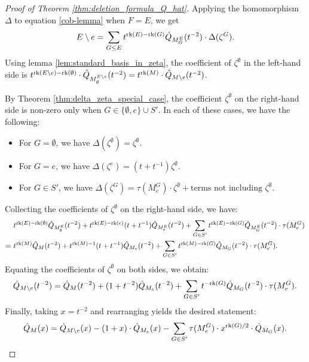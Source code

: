\documentclass[10pt]{article}
\newcommand{\rank}{\normalfont\text{rk}}
\theoremstyle{remark}
\begin{document}
\begin{proof}[Proof of Theorem \ref{thm:deletion_formula_Q_hat}]
    Applying the homomorphism $\Delta$ to equation \eqref{cob-lemma}
    when $F = E$, we get 
    \[E\setminus e = \sum_{G \leq E} t^{\rank(E) - \rank(G)} \hat{Q}_{M_G^E}(t^{-2}) \cdot \Delta(\zeta^G).\] 
    Using lemma \ref{lem:standard_basis_in_zeta}, the coefficient of $\zeta^\emptyset$ in the left-hand side is
    $t^{\rank(E\setminus e) - \rank(\emptyset)}\cdot
    \hat{Q}_{M_\emptyset^{E\setminus e}}(t^{-2}) = t^{\rank(M)}\cdot
    \hat{Q}_{M\setminus e}(t^{-2})$.
    
    By Theorem \ref{thm:delta_zeta_special_case}, the coefficient $\zeta^\emptyset$ on the right-hand side is non-zero only when $G\in \{\emptyset, e\} \cup S'$. In each of these cases, we have the following:
    \begin{itemize}
        \item For $G = \emptyset$, we have $\Delta(\zeta^\emptyset) = \zeta^\emptyset$.
        \item For $G = e$, we have $\Delta(\zeta^e) = (t+t^{-1})\zeta^\emptyset$.
        \item For $G\in S'$, we have $\Delta(\zeta^G) = \tau(M^G_e)\cdot\zeta^\emptyset
            +\text{terms not including $\zeta^\emptyset$}$.
    \end{itemize}
    
    Collecting the coefficients of
    $\zeta^\emptyset$ on the right-hand side, we have:
    \begin{align*}
        &t^{\rank(E) - \rank(\emptyset)}
        \hat{Q}_{M_\emptyset^E}(t^{-2}) + t^{\rank(E) - \rank(e)}(t+t^{-1})
        \hat{Q}_{M_e^E}(t^{-2}) + \sum_{G\in S'} t^{\rank(E) - \rank(G)}
        \hat{Q}_{M_G^E}(t^{-2})\cdot \tau(M^G_e)\\
        =\ &t^{\rank(M)}
        \hat{Q}_{M}(t^{-2}) + t^{\rank(M) - 1}(t+t^{-1})
        \hat{Q}_{M_e}(t^{-2}) + \sum_{G\in S'} t^{\rank(M) - \rank(G)}
        \hat{Q}_{M_G}(t^{-2})\cdot \tau(M^G_e).
    \end{align*}
    Equating the coefficients of $\zeta^\emptyset$ on both sides, we obtain:
    \[\hat{Q}_{M\setminus e}(t^{-2}) = \hat{Q}_{M}(t^{-2}) + (1+t^{-2})
    \hat{Q}_{M_e}(t^{-2}) + \sum_{G\in S'} t^{- \rank(G)}
    \hat{Q}_{M_G}(t^{-2})\cdot \tau(M^G_e).\]
    Finally, taking $x = t^{-2}$ and rearranging yields the desired statement: \[
    \hat{Q}_M(x) = \hat{Q}_{M\setminus e}(x) -(1 + x)\cdot \hat{Q}_{M_e}(x) -
    \sum_{G \in S'}{\tau(M^G_e)\cdot x^{\rank(G)/2}\cdot
    \hat{Q}_{M_G}(x)}.
\]
\end{proof}
\end{document}
